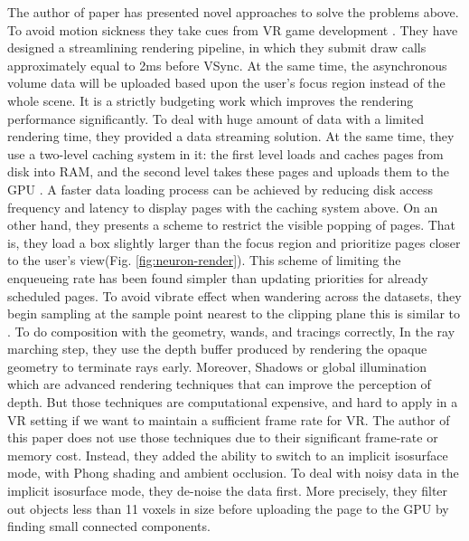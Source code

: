 \documentclass[10pt,twocolumn,letterpaper]{article}
\begin{document}
The author of paper \cite{Usher2018} has presented novel approaches to solve the problems above. To avoid motion sickness they take cues from VR game development \cite{Vlachos2015}. They have designed a streamlining rendering pipeline, in which they submit draw calls approximately equal to 2ms before VSync. At the same time, the asynchronous volume data will be uploaded based upon the user’s focus region instead of the whole scene. It is a strictly budgeting work which improves the rendering performance significantly. To deal with huge amount of data with a limited rendering time, they provided a data streaming solution. At the same time, they use a two-level caching system in it: the first level loads and caches pages from disk into RAM, and the second level takes these pages and uploads them to the GPU \cite{Baker:1977} . A faster data loading process can be achieved by reducing disk access frequency and latency to display pages with the caching system above. On an other hand, they presents a scheme to restrict the visible popping of pages. That is, they load a box slightly larger than the focus region and prioritize pages closer to the user’s view(Fig. \ref{fig:neuron-render}). This scheme of limiting the enqueueing rate has been found simpler than updating priorities for already scheduled pages. To avoid vibrate effect when wandering across the datasets, they begin sampling at the sample point nearest to the clipping plane this is similar to \cite{291532}. To do composition with the geometry, wands, and tracings correctly, In the ray marching step, they use the depth buffer produced by rendering the opaque geometry to terminate rays early. Moreover, Shadows or global illumination which are advanced rendering techniques that can improve the perception of depth. But those techniques are computational expensive, and hard to apply in a VR setting if we want to maintain a sufficient frame rate for VR. The author of this paper does not use those techniques due to their significant frame-rate or memory cost. Instead, they added the ability to switch to an implicit isosurface mode, with Phong shading and ambient occlusion. To deal with noisy data in the implicit isosurface mode, they de-noise the data first. More precisely, they filter out objects less than 11 voxels in size before uploading the page to the GPU by finding small connected components.
\end{document}
